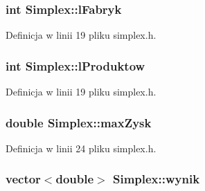 \hypertarget{class_simplex_a0f6d3ab52d2961e257233c81d4c64c81}{
\subsubsection[{l\-Fabryk}]{\setlength{\rightskip}{0pt plus 5cm}int {\bf \-Simplex\-::l\-Fabryk}}}\label{class_simplex_a0f6d3ab52d2961e257233c81d4c64c81}


\-Definicja w linii 19 pliku simplex.\-h.

\hypertarget{class_simplex_af05273be3561d707b029894f551bf1fc}{
\subsubsection[{l\-Produktow}]{\setlength{\rightskip}{0pt plus 5cm}int {\bf \-Simplex\-::l\-Produktow}}}\label{class_simplex_af05273be3561d707b029894f551bf1fc}


\-Definicja w linii 19 pliku simplex.\-h.

\hypertarget{class_simplex_a542e1d670562fb3fa9f11546071c6738}{
\subsubsection[{max\-Zysk}]{\setlength{\rightskip}{0pt plus 5cm}double {\bf \-Simplex\-::max\-Zysk}}}\label{class_simplex_a542e1d670562fb3fa9f11546071c6738}


\-Definicja w linii 24 pliku simplex.\-h.

\hypertarget{class_simplex_a18ae1c3fa2099205b28eb7200c061e9c}{
\subsubsection[{wynik}]{\setlength{\rightskip}{0pt plus 5cm}vector$<$double$>$ {\bf \-Simplex\-::wynik}}}\label{class_simplex_a18ae1c3fa2099205b28eb7200c061e9c}



